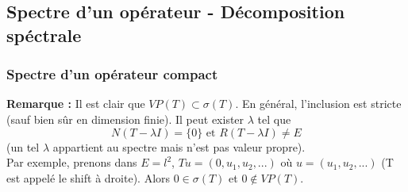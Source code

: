 \subsection{Spectre d'un opérateur - Décomposition spéctrale}
\subsubsection{Spectre d'un opérateur compact}

\textbf{Remarque :} Il est clair que $VP(T)\subset \sigma(T)$. En général, l'inclusion est stricte (sauf bien sûr en dimension finie). Il peut exister $\lambda$ tel que 
\[N(T-\lambda I)=\{0\} \text{ et } R(T-\lambda I)\neq E\]
(un tel $\lambda$ appartient au spectre mais n'est pas valeur propre).\\
Par exemple, prenons dans $E=l^2$, $Tu=(0,u_1,u_2,...)$ où $u=(u_1,u_2,...)$ (T est appelé le shift à droite). Alors $0\in\sigma(T)$ et $0\not\in VP(T)$.


\begin{dem}

\end{dem}
